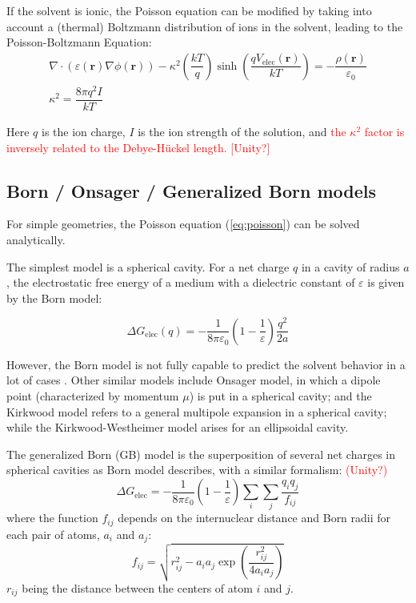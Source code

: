 If the solvent is ionic, the Poisson equation can be modified by taking
into account a (thermal) Boltzmann distribution of ions in the solvent,
leading to the Poisson-Boltzmann Equation:
\begin{equation}
\begin{array}{r}
\nabla\cdot(\varepsilon(\mathbf{r})\nabla\phi(\mathbf{r}))-\kappa^{2}\left(\dfrac{kT}{q}\right)\sinh\left(\dfrac{qV_{\mathrm{elec}}(\mathbf{r})}{kT}\right)=-\dfrac{\rho(\mathbf{r})}{\varepsilon_{0}}\\
\kappa^{2}=\dfrac{8\pi q^{2}I}{kT}
\end{array}
\end{equation}


Here $q$ is the ion charge, $I$ is the ion strength of the solution,
and \textcolor{red}{the $\kappa^{2}$ factor is inversely related
to the Debye-Hückel length. {[}Unity?{]}}


\subsection{Born / Onsager / Generalized Born models\label{sub:Born-/-Onsager}}

For simple geometries, the Poisson equation (\ref{eq:poisson}) can
be solved analytically.

The simplest model is a spherical cavity. For a net charge $q$ in
a cavity of radius $a$, the electrostatic free energy of a medium
with a dielectric constant of $\varepsilon$ is given by the Born
model: 

\begin{equation}
\Delta G_{\mathrm{elec}}(q)=-\dfrac{1}{8\pi\varepsilon_{0}}\left(1-\frac{1}{\varepsilon}\right)\frac{q^{2}}{2a}
\end{equation}


However, the Born model is not fully capable to predict the solvent
behavior in a lot of cases \citep{Jensen}. Other similar models include
Onsager model, in which a dipole point (characterized by momentum
$\mu$) is put in a spherical cavity; and the Kirkwood model refers
to a general multipole expansion in a spherical cavity; while the
Kirkwood-Westheimer model arises for an ellipsoidal cavity.

The generalized Born (GB) model is the superposition of several net
charges in spherical cavities as Born model describes, with a similar
formalism: \textcolor{red}{(Unity?)}
\begin{equation}
\Delta G_{\mathrm{elec}}=-\dfrac{1}{8\pi\varepsilon_{0}}\left(1-\frac{1}{\varepsilon}\right)\sum_{i}\sum_{j}\frac{q_{i}q_{j}}{f_{ij}}
\end{equation}
where the function $f_{ij}$ depends on the internuclear distance
and Born radii for each pair of atoms, $a_{i}$ and $a_{j}$:
\begin{equation}
f_{ij}=\sqrt{r_{ij}^{2}-a_{i}a_{j}\exp\left(\frac{r_{ij}^{2}}{4a_{i}a_{j}}\right)}
\end{equation}
$r_{ij}$ being the distance between the centers of atom $i$ and
$j$. 

